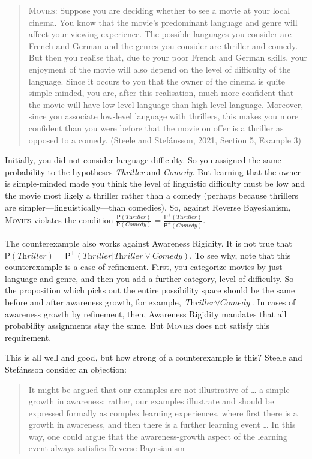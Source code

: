 \documentclass[
  11pt,
  dvipsnames,enabledeprecatedfontcommands]{scrartcl}
\newcommand{\pr}[1]{\ensuremath{\mathsf{P}(#1)}}
\newcommand{\ppr}[2]{\ensuremath{\mathsf{P}^{#1}(#2)}}
\begin{document}
\begin{quote}
\textsc{Movies}: Suppose you are deciding whether to see a movie at your
local cinema. You know that the movie's predominant language and genre
will affect your viewing experience. The possible languages you consider
are French and German and the genres you consider are thriller and
comedy. But then you realise that, due to your poor French and German
skills, your enjoyment of the movie will also depend on the level of
difficulty of the language. Since it occurs to you that the owner of the
cinema is quite simple-minded, you are, after this realisation, much
more confident that the movie will have low-level language than
high-level language. Moreover, since you associate low-level language
with thrillers, this makes you more confident than you were before that
the movie on offer is a thriller as opposed to a comedy. (Steele and
Stefánsson, 2021, Section 5, Example 3)
\end{quote}

\noindent Initially, you did not consider language difficulty. So you
assigned the same probability to the hypotheses \textit{Thriller} and
\textit{Comedy}. But learning that the owner is simple-minded made you
think the level of linguistic difficulty must be low and the movie most
likely a thriller rather than a comedy (perhaps because thrillers are
simpler---linguistically---than comedies). So, against Reverse
Bayesianism, \textsc{Movies} violates the condition
\(\frac{\pr{\textit{Thriller}}}{\pr{\textit{Comedy}}}=\frac{\ppr{+}{\textit{Thriller}}}{\ppr{+}{\textit{Comedy}}}\).

The counterexample also works against Awareness Rigidity. It is not true
that
\(\pr{\textit{Thriller}}=\ppr{+}{\textit{Thriller} \vert \textit{Thriller}\vee \textit{Comedy}}\).
To see why, note that this counterexample is a case of refinement.
First, you categorize movies by just language and genre, and then you
add a further category, level of difficulty. So the proposition which
picks out the entire possibility space should be the same before and
after awareness growth, for example,
\(\textit{Thriller}\vee \textit{Comedy}\). In cases of awareness growth
by refinement, then, Awareness Rigidity mandates that all probability
assignments stay the same. But \textsc{Movies} does not satisfy this
requirement.

This is all well and good, but how strong of a counterexample is this?
Steele and Stefánsson consider an objection:

\begin{quote}
It might be argued that our examples are not illustrative of \ldots{} a
simple growth in awareness; rather, our examples illustrate and should
be expressed formally as complex learning experiences, where first there
is a growth in awareness, and then there is a further learning event
\ldots{} In this way, one could argue that the awareness-growth aspect
of the learning event always satisfies Reverse Bayesianism
\end{quote}
\end{document}
